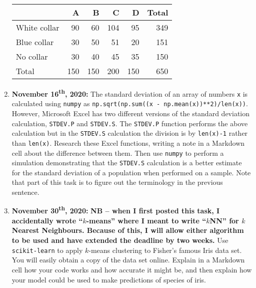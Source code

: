 \documentclass[a4paper, 12pt]{scrartcl}
\begin{document}
\begin{enumerate}
        \begin{table}[H]
          \setlength{\tabcolsep}{12pt}
          \renewcommand{\arraystretch}{1.1}
          \centering
          \begin{tabular}{lrrrrr}
            & A & B & C& D & Total \\
            \midrule
            White collar & 90 & 60 & 104 & 95 & 349 \\
            Blue collar & 30 & 50 & 51 & 20 & 151 \\
            No collar & 30 & 40 & 45 & 35 & 150 \\
            \midrule
            Total & 150 & 150 & 200 & 150 & 650
          \end{tabular}
        \end{table}
        \newpage
      \item
        \textbf{November 16\textsuperscript{th}, 2020:}
        The standard deviation of an array of numbers \texttt{x} is calculated using \texttt{numpy} as \texttt{np.sqrt(np.sum((x - np.mean(x))**2)/len(x))}.
        However, Microsoft Excel has two different versions of the standard deviation calculation, \texttt{STDEV.P} and \texttt{STDEV.S}.
        The \texttt{STDEV.P} function performs the above calculation but in the \texttt{STDEV.S} calculation the division is by \texttt{len(x)-1} rather than \texttt{len(x)}.
        Research these Excel functions, writing a note in a Markdown cell about the difference between them.
        Then use \texttt{numpy} to perform a simulation demonstrating that the \texttt{STDEV.S} calculation is a better estimate for the standard deviation of a population when performed on a sample.
        Note that part of this task is to figure out the terminology in the previous sentence.
      \item
        \textbf{November 30\textsuperscript{th}, 2020:}
        \textbf{NB -- when I first posted this task, I accidentally wrote ``$k$-means'' where I meant to write ``$k$NN'' for $k$ Nearest Neighbours.
        Because of this, I will allow either algorithm to be used and have extended the deadline by two weeks.}
        Use \texttt{scikit-learn} to apply $k$-means clustering to Fisher's famous Iris data set.
        You will easily obtain a copy of the data set online.
        Explain in a Markdown cell how your code works and how accurate it might be, and then explain how your model could be used to make predictions of species of iris.
    \end{enumerate}
\end{document}
